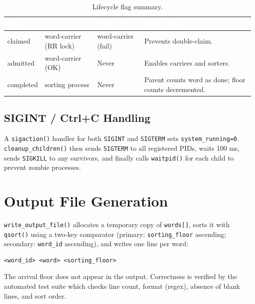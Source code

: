 \documentclass[12pt,a4paper]{article}
\newcommand{\code}[1]{\texttt{\small #1}}
\begin{document}
\begin{table}[htbp]
\centering
\caption{Lifecycle flag summary.}
\begin{tabularx}{\textwidth}{>{\ttfamily}l l l X}
\toprule
\rowcolor{darkblue}
\textcolor{white}{\textbf{Flag}} &
\textcolor{white}{\textbf{Set by}} &
\textcolor{white}{\textbf{Cleared by}} &
\textcolor{white}{\textbf{Effect when 1}} \\
\midrule
claimed   & word-carrier (RR lock) & word-carrier (fail) & Prevents double-claim. \\
\rowcolor{rowgray}
admitted  & word-carrier (OK)      & Never               & Enables carriers and sorters. \\
completed & sorting process        & Never               & Parent counts word as done; floor counts decremented. \\
\bottomrule
\end{tabularx}
\end{table}

\subsection{SIGINT / Ctrl+C Handling}

A \code{sigaction()} handler for both \code{SIGINT} and \code{SIGTERM} sets
\code{system\_running=0}. \code{cleanup\_children()} then sends \code{SIGTERM} to
all registered PIDs, waits 100 ms, sends \code{SIGKILL} to any survivors, and
finally calls \code{waitpid()} for each child to prevent zombie processes.

\section{Output File Generation}

\code{write\_output\_file()} allocates a temporary copy of \code{words[]},
sorts it with \code{qsort()} using a two-key comparator (primary:
\code{sorting\_floor} ascending; secondary: \code{word\_id} ascending), and writes
one line per word:

\begin{lstlisting}[language={},caption={Output file format (no blank lines).}]
<word_id> <word> <sorting_floor>
\end{lstlisting}

The arrival floor does not appear in the output. Correctness is verified by the
automated test suite which checks line count, format (regex), absence of blank
lines, and sort order.
\end{document}
